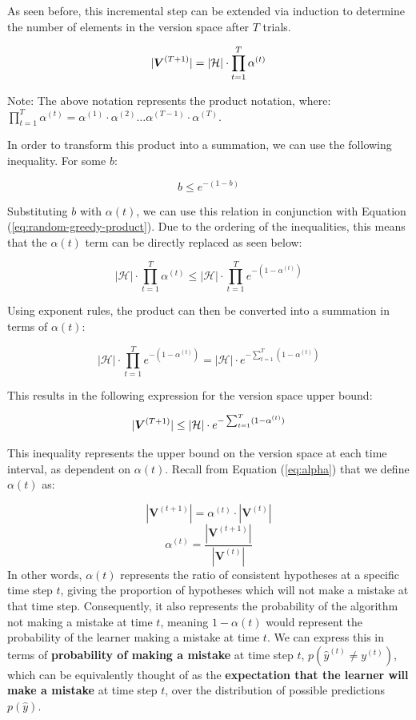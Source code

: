 \documentclass[11pt]{article}
\begin{document}
As seen before, this incremental step can be extended via induction to determine the number of elements in the version space after $T$ trials. 

\begin{equation}
\centering
|\boldsymbol{V}^{(T+1)}| = |\mathcal{H}| \cdot \prod_{t=1}^T \alpha^{(t)}
\label{eq:random-greedy-product}
\end{equation}

Note: The above notation represents the product notation, where: $\prod_{t=1}^T \alpha^{(t)} = \alpha^{(1)} \cdot \alpha^{(2)} \dots \alpha^{(T-1)} \cdot \alpha^{(T)}$.

In order to transform this product into a summation, we can use the following inequality. For some $b$:

$$ b \leq e^{-(1-b)} $$ 

Substituting $b$ with $\alpha(t)$, we can use this relation in conjunction with Equation (\ref{eq:random-greedy-product}). Due to the ordering of the inequalities, this means that the $\alpha(t)$ term can be directly replaced as seen below:

$$ |\mathcal{H}| \cdot \prod_{t=1}^T \alpha^{(t)} \leq |\mathcal{H}| \cdot \prod_{t=1}^T e^{-(1-\alpha^{(t)})}$$

Using exponent rules, the product can then be converted into a summation in terms of $\alpha(t)$:

$$|\mathcal{H}| \cdot \prod_{t=1}^T e^{-(1-\alpha^{(t)})} = |\mathcal{H}| \cdot e^{- \sum_{t=1}^T (1-\alpha^{(t)})} $$


This results in the following expression for the version space upper bound:

\begin{equation}
\centering
|\boldsymbol{V}^{(T+1)}| \leq |\mathcal{H}| \cdot e^{- \sum_{t=1}^T (1-\alpha^{(t)})}
\label{eq:random-greedy-upper-bound}
\end{equation}

This inequality represents the upper bound on the version space at each time interval, as dependent on $\alpha(t)$. Recall from Equation (\ref{eq:alpha}) that we define $\alpha(t)$ as: 

$$|\boldsymbol{V}^{(t+1)}| = \alpha^{(t)} \cdot |\boldsymbol{V}^{(t)}|$$
$$ \alpha^{(t)} = \frac{|\boldsymbol{V}^{(t+1)}|}{|\boldsymbol{V}^{(t)}|} $$
In other words, $\alpha(t)$ represents the ratio of consistent hypotheses at a specific time step $t$, giving the proportion of hypotheses which will not make a mistake at that time step. Consequently, it also represents the probability of the algorithm not making a mistake at time $t$, meaning $1-\alpha(t)$ would represent the probability of the learner making a mistake at time $t$. We can express this in terms of \textbf{probability of making a mistake} at time step $t$, $p(\hat{y}^{(t)} \neq y^{(t)})$, which can be equivalently thought of as the \textbf{expectation that the learner will make a mistake} at time step $t$, over the distribution of possible predictions $p(\hat{y})$.
\end{document}
